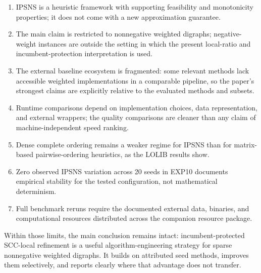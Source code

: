 \begin{enumerate}
    \item IPSNS is a heuristic framework with supporting feasibility and monotonicity properties; it does not come with a new approximation guarantee.
    \item The main claim is restricted to nonnegative weighted digraphs; negative-weight instances are outside the setting in which the present local-ratio and incumbent-protection interpretation is used.
    \item The external baseline ecosystem is fragmented: some relevant methods lack accessible weighted implementations in a comparable pipeline, so the paper's strongest claims are explicitly relative to the evaluated methods and subsets.
    \item Runtime comparisons depend on implementation choices, data representation, and external wrappers; the quality comparisons are cleaner than any claim of machine-independent speed ranking.
    \item Dense complete ordering remains a weaker regime for IPSNS than for matrix-based pairwise-ordering heuristics, as the LOLIB results show.
    \item Zero observed IPSNS variation across 20 seeds in EXP10 documents empirical stability for the tested configuration, not mathematical determinism.
    \item Full benchmark reruns require the documented external data, binaries, and computational resources distributed across the companion resource package.
\end{enumerate}

Within those limits, the main conclusion remains intact: incumbent-protected SCC-local refinement is a useful algorithm-engineering strategy for sparse nonnegative weighted digraphs. It builds on attributed seed methods, improves them selectively, and reports clearly where that advantage does not transfer.
